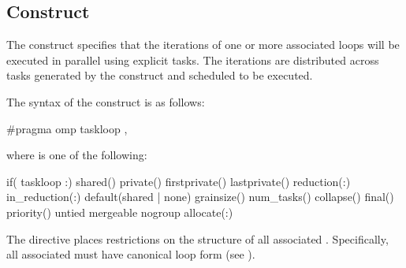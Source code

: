\subsection{ Construct}
\label{subsec:taskloop Construct}
\summary
The  construct specifies that the iterations of one or more 
associated loops will be executed in parallel using explicit tasks. The 
iterations are distributed across tasks generated by the construct and 
scheduled to be executed.
\syntax
\begin{ccppspecific}
The syntax of the  construct is as follows:
\begin{ompcPragma}
#pragma omp taskloop \plc{[clause[[},\plc{] clause] ...] new-line}
\end{ompcPragma}
where  is one of the following:
\begin{indentedcodelist}
if(\plc{[} taskloop :\plc{] scalar-expression})
shared()
private()
firstprivate()
lastprivate()
reduction(:)
in_reduction(:)
default(shared \textnormal{|} none)
grainsize()
num_tasks()
collapse()
final()
priority()
untied
mergeable
nogroup
allocate(\plc{[allocator }:\plc{] list})
\end{indentedcodelist}

The  directive places restrictions on the structure of all 
associated . Specifically, all associated  
must have canonical loop form (see ).
\end{ccppspecific}
